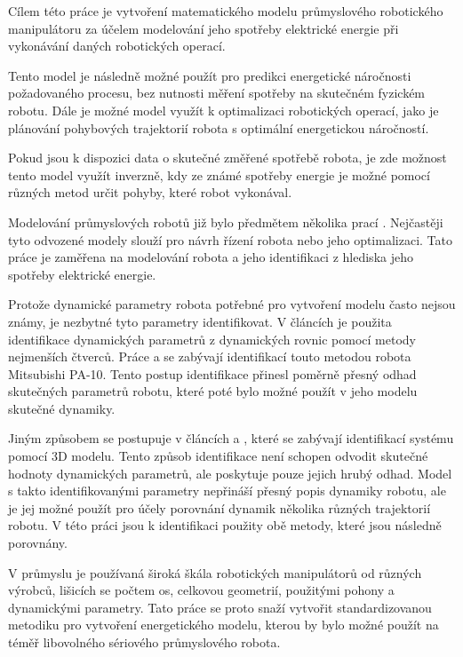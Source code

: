 Cílem této práce je vytvoření matematického modelu průmyslového robotického manipulátoru za účelem modelování jeho spotřeby elektrické energie při vykonávání daných robotických operací. 

Tento model je následně možné použít pro predikci energetické náročnosti požadovaného procesu, bez nutnosti měření spotřeby na skutečném fyzickém robotu. Dále je možné model využít k optimalizaci robotických operací, jako je plánování pohybových trajektorií robota s optimální energetickou náročností. 

Pokud jsou k dispozici data o skutečné změřené spotřebě robota, je zde možnost tento model využít inverzně, kdy ze známé spotřeby energie je možné pomocí různých metod určit pohyby, které robot vykonával.

Modelování průmyslových robotů již bylo předmětem několika prací \cite{rob_mod_control}\cite{handbook_of_robotics}. Nejčastěji tyto odvozené modely slouží pro návrh řízení robota nebo jeho optimalizaci. Tato práce je zaměřena na modelování robota a jeho identifikaci z hlediska jeho spotřeby elektrické energie. 

Protože dynamické parametry robota potřebné pro vytvoření modelu často nejsou známy, je nezbytné tyto parametry identifikovat. V článcích \cite{par_iden_rob}\cite{clos_dyn_par} je použita identifikace dynamických parametrů z dynamických rovnic pomocí metody nejmenších čtverců. Práce \cite{dyn_mod_ind} a \cite{dyn_ind_mits} se zabývají identifikací touto metodou robota Mitsubishi PA-10. Tento postup identifikace přinesl poměrně přesný odhad skutečných parametrů robotu, které poté bylo možné použít v jeho modelu skutečné dynamiky. 

Jiným způsobem se postupuje v článcích \cite{dyn_ind_man} a \cite{akeel}, které se zabývají identifikací systému pomocí 3D modelu. Tento způsob identifikace není schopen odvodit skutečné hodnoty dynamických parametrů, ale poskytuje pouze jejich hrubý odhad. Model s takto identifikovanými parametry nepřináší přesný popis dynamiky robotu, ale je jej možné použít pro účely porovnání dynamik několika různých trajektorií robotu. V této práci jsou k identifikaci použity obě metody, které jsou následně porovnány.

V průmyslu je používaná široká škála robotických manipulátorů od různých výrobců, lišicích se počtem os, celkovou geometrií, použitými pohony a dynamickými parametry. Tato práce se proto snaží vytvořit standardizovanou metodiku pro vytvoření energetického modelu, kterou by bylo možné použít na téměř libovolného sériového průmyslového robota.
